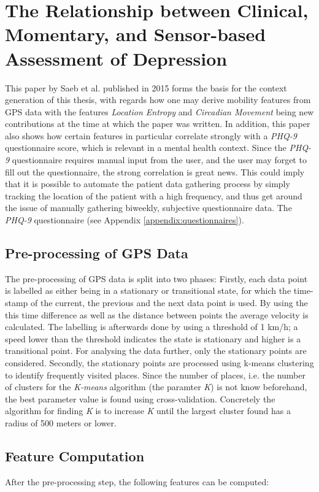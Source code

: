 \section{The Relationship between Clinical, Momentary, and Sensor-based Assessment of Depression}
This paper by Saeb et al. published in 2015 \cite{Saeb2015} forms the basis for the context generation of this thesis, with regards how one may derive mobility features from GPS data with the features \textit{Location Entropy} and \textit{Circadian Movement} being new contributions at the time at which the paper was written. In addition, this paper also shows how certain features in particular correlate strongly with a \textit{PHQ-9} questionnaire score, which is relevant in a mental health context. Since the \textit{PHQ-9} questionnaire requires manual input from the user, and the user may forget to fill out the questionnaire, the strong correlation is great news. This could imply that it is possible to automate the patient data gathering process by simply tracking the location of the patient with a high frequency, and thus get around the issue of manually gathering biweekly, subjective questionnaire data. The \textit{PHQ-9} questionnaire (see Appendix \ref{appendix:questionnaires}).

\subsection{Pre-processing of GPS Data}
The pre-processing of GPS data is split into two phases:  Firstly, each data point is labelled as either being in a stationary or transitional state, for which the time-stamp of the current, the previous and the next data point is used. By using the this time difference as well as the distance between points the average velocity is calculated. The labelling is afterwards done by using a threshold of 1 km/h; a speed lower than the threshold indicates the state is stationary and higher is a transitional point. For analysing the data further, only the stationary points are considered. Secondly, the stationary points are processed using k-means clustering to identify frequently visited places. Since the number of places, i.e. the number of clusters for the \textit{K-means} algorithm (the paramter \textit{K}) is not know beforehand, the best parameter value is found using cross-validation. Concretely the algorithm for finding \textit{K} is to increase \textit{K} until the largest cluster found has a radius of 500 meters or lower.

\subsection{Feature Computation}
After the pre-processing step, the following features can be computed:\\

